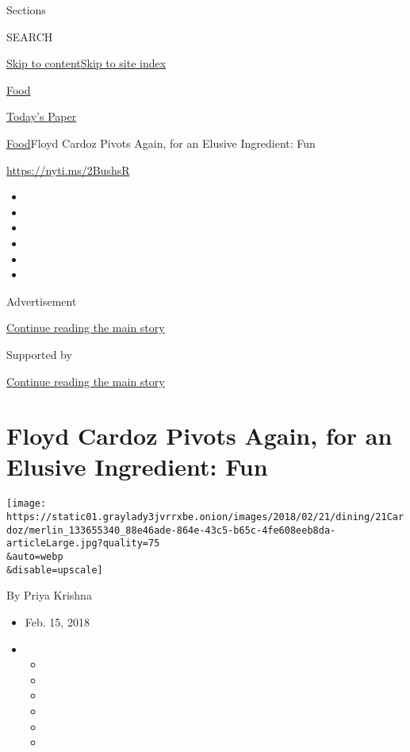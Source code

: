 Sections

SEARCH

\protect\hyperlink{site-content}{Skip to
content}\protect\hyperlink{site-index}{Skip to site index}

\href{https://www.nytimes3xbfgragh.onion/section/food}{Food}

\href{https://myaccount.nytimes3xbfgragh.onion/auth/login?response_type=cookie\&client_id=vi}{}

\href{https://www.nytimes3xbfgragh.onion/section/todayspaper}{Today's
Paper}

\href{/section/food}{Food}\textbar{}Floyd Cardoz Pivots Again, for an
Elusive Ingredient: Fun

\url{https://nyti.ms/2BushsR}

\begin{itemize}
\item
\item
\item
\item
\item
\item
\end{itemize}

Advertisement

\protect\hyperlink{after-top}{Continue reading the main story}

Supported by

\protect\hyperlink{after-sponsor}{Continue reading the main story}

\hypertarget{floyd-cardoz-pivots-again-for-an-elusive-ingredient-fun}{%
\section{Floyd Cardoz Pivots Again, for an Elusive Ingredient:
Fun}\label{floyd-cardoz-pivots-again-for-an-elusive-ingredient-fun}}

\texttt{[image: https://static01.graylady3jvrrxbe.onion/images/2018/02/21/dining/21Cardoz/merlin\_133655340\_88e46ade-864e-43c5-b65c-4fe608eeb8da-articleLarge.jpg?quality=75\\\&auto=webp\\\&disable=upscale]}

By Priya Krishna

\begin{itemize}
\item
  Feb. 15, 2018
\item
  \begin{itemize}
  \item
  \item
  \item
  \item
  \item
  \item
  \end{itemize}
\end{itemize}


